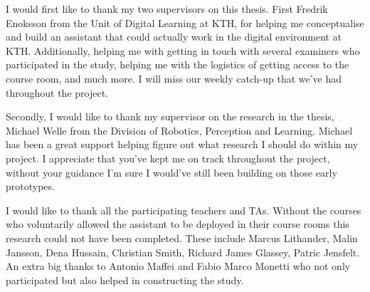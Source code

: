 ﻿%




I would first like to thank my two supervisors on this thesis. First Fredrik Enoksson from the Unit of Digital Learning at KTH, for helping me conceptualise and build an assistant that could actually work in the digital environment at KTH. Additionally, helping me with getting in touch with several examiners who participated in the study, helping me with the logistics of getting access to the course room, and much more. I will miss our weekly catch-up that we’ve had throughout the project.


Secondly, I would like to thank my supervisor on the research in the thesis, Michael Welle from the Division of Robotics, Perception and Learning. Michael has been a great support helping figure out what research I should do within my project. I appreciate that you’ve kept me on track throughout the project, without your guidance I’m sure I would’ve still been building on those early prototypes.


I would like to thank all the participating teachers and TAs. Without the courses who voluntarily allowed the assistant to be deployed in their course rooms this research could not have been completed. These include Marcus Lithander, Malin Jansson, Dena Hussain, Christian Smith, Richard James Glassey,  Patric Jensfelt. An extra big thanks to Antonio Maffei and Fabio Marco Monetti who not only participated but also helped in constructing the study.


